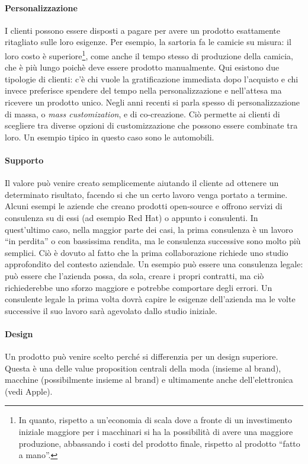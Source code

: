 \paragraph*{Personalizzazione} I clienti possono essere disposti a pagare per
avere un prodotto esattamente ritagliato sulle loro esigenze. Per esempio, la
sartoria fa le camicie su misura: il loro costo è superiore\footnote{In quanto,
rispetto a un'economia di scala dove a fronte di un investimento iniziale
maggiore per i macchinari si ha la possibilità di avere una maggiore
produzione, abbassando i costi del prodotto finale, rispetto al prodotto
``fatto a mano''.}, come anche il tempo stesso di produzione della camicia, che
è più lungo poichè deve essere prodotto manualmente. Qui esistono due tipologie
di clienti: c'è chi vuole la gratificazione immediata dopo l'acquisto e chi
invece preferisce spendere del tempo nella personalizzazione e nell'attesa ma
ricevere un prodotto unico.
Negli anni recenti si parla spesso di personalizzazione di massa, o
\textit{mass customization}, e di co-creazione. Ciò permette ai clienti di
scegliere tra diverse opzioni di customizzazione che possono essere combinate
tra loro. Un esempio tipico in questo caso sono le automobili.

\paragraph*{Supporto} Il valore può venire creato semplicemente aiutando il
cliente ad ottenere un determinato risultato, facendo si che un certo lavoro
venga portato a termine. Alcuni esempi le aziende che creano prodotti
open-source e offrono servizi di consulenza su di essi (ad esempio Red Hat) o
appunto i consulenti. In quest'ultimo caso, nella maggior parte dei casi, la
prima consulenza è un lavoro ``in perdita'' o con bassissima rendita, ma le
consulenza successive sono molto più semplici. Ciò è dovuto al fatto che la
prima collaborazione richiede uno studio approfondito del contesto aziendale.
Un esempio può essere una consulenza legale: può essere che l'azienda possa, da
sola, creare i propri contratti, ma ciò richiederebbe uno sforzo maggiore e
potrebbe comportare degli errori. Un consulente legale la prima volta dovrà
capire le esigenze dell'azienda ma le volte successive il suo lavoro sarà
agevolato dallo studio iniziale.

\paragraph*{Design} Un prodotto può venire scelto perché si differenzia per un
design superiore. Questa è una delle value proposition centrali della moda
(insieme al brand), macchine (possibilmente insieme al brand) e ultimamente
anche dell'elettronica (vedi Apple).

